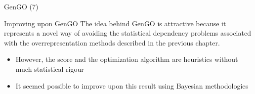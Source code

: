 \documentclass{beamer}
\begin{document}
\begin{frame}[fragile]{GenGO (7)}
 \begin{mybluebox}{Improving upon GenGO}
 The idea behind
GenGO is  attractive because it represents a novel way
of avoiding the statistical dependency problems associated with the
overrepresentation methods described in the previous chapter.  
 \end{mybluebox}
\begin{itemize}
 \item However, the score and the optimization algorithm are heuristics without much statistical 
rigour
\item It seemed possible to improve upon this result using Bayesian methodologies
\end{itemize}

 
\end{frame}
\end{document}
